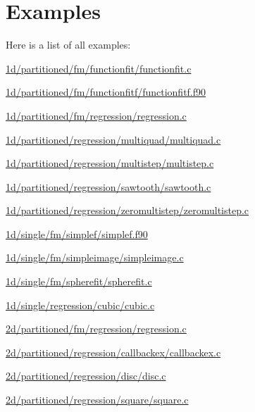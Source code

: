 \section{Examples}
Here is a list of all examples\+:\begin{DoxyCompactItemize}
\item 
\hyperlink{1d_2partitioned_2fm_2functionfit_2functionfit_8c-example}{1d/partitioned/fm/functionfit/functionfit.\+c}
\item 
\hyperlink{1d_2partitioned_2fm_2functionfitf_2functionfitf_8f90-example}{1d/partitioned/fm/functionfitf/functionfitf.\+f90}
\item 
\hyperlink{1d_2partitioned_2fm_2regression_2regression_8c-example}{1d/partitioned/fm/regression/regression.\+c}
\item 
\hyperlink{1d_2partitioned_2regression_2multiquad_2multiquad_8c-example}{1d/partitioned/regression/multiquad/multiquad.\+c}
\item 
\hyperlink{1d_2partitioned_2regression_2multistep_2multistep_8c-example}{1d/partitioned/regression/multistep/multistep.\+c}
\item 
\hyperlink{1d_2partitioned_2regression_2sawtooth_2sawtooth_8c-example}{1d/partitioned/regression/sawtooth/sawtooth.\+c}
\item 
\hyperlink{1d_2partitioned_2regression_2zeromultistep_2zeromultistep_8c-example}{1d/partitioned/regression/zeromultistep/zeromultistep.\+c}
\item 
\hyperlink{1d_2single_2fm_2simplef_2simplef_8f90-example}{1d/single/fm/simplef/simplef.\+f90}
\item 
\hyperlink{1d_2single_2fm_2simpleimage_2simpleimage_8c-example}{1d/single/fm/simpleimage/simpleimage.\+c}
\item 
\hyperlink{1d_2single_2fm_2spherefit_2spherefit_8c-example}{1d/single/fm/spherefit/spherefit.\+c}
\item 
\hyperlink{1d_2single_2regression_2cubic_2cubic_8c-example}{1d/single/regression/cubic/cubic.\+c}
\item 
\hyperlink{2d_2partitioned_2fm_2regression_2regression_8c-example}{2d/partitioned/fm/regression/regression.\+c}
\item 
\hyperlink{2d_2partitioned_2regression_2callbackex_2callbackex_8c-example}{2d/partitioned/regression/callbackex/callbackex.\+c}
\item 
\hyperlink{2d_2partitioned_2regression_2disc_2disc_8c-example}{2d/partitioned/regression/disc/disc.\+c}
\item 
\hyperlink{2d_2partitioned_2regression_2square_2square_8c-example}{2d/partitioned/regression/square/square.\+c}
\end{DoxyCompactItemize}
